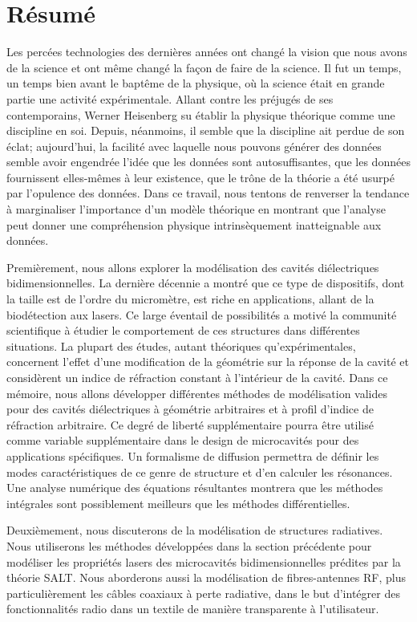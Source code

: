 \chapter*{Résumé}
Les percées technologies des dernières années ont changé
la vision que nous avons de la science et ont même changé
la façon de faire de la science. Il fut un temps, un temps
bien avant le baptême de la physique, où la science était
en grande partie une activité expérimentale. Allant 
contre les préjugés de ses contemporains, Werner
Heisenberg su établir la physique théorique comme une
discipline en soi. Depuis, néanmoins, il semble que la
discipline ait perdue de son éclat; aujourd'hui, la facilité
avec laquelle nous pouvons générer des données semble avoir
engendrée l'idée que les données sont autosuffisantes, 
que les données fournissent elles-mêmes à leur existence, 
que le trône de la théorie a été usurpé par l'opulence
des données. Dans ce travail, nous tentons de renverser
la tendance à marginaliser l'importance d'un modèle 
théorique en montrant que l'analyse peut donner une 
compréhension physique intrinsèquement inatteignable 
aux données. 

Premièrement, nous allons explorer la modélisation des
cavités diélectriques bidimensionnelles. La dernière
décennie a montré que ce type de dispositifs, dont la 
taille est de l'ordre du micromètre, est riche en applications, 
allant de la biodétection aux lasers. Ce large éventail de
possibilités a motivé la communité scientifique à étudier
le comportement de ces structures dans différentes situations.
La plupart des études, autant théoriques qu'expérimentales, 
concernent l'effet d'une modification de la géométrie 
sur la réponse de la cavité et considèrent un 
indice de réfraction constant à l'intérieur de la cavité. 
Dans ce mémoire, nous allons développer différentes méthodes
de modélisation valides pour des cavités diélectriques à géométrie
arbitraires et à profil d'indice de réfraction arbitraire. Ce
degré de liberté supplémentaire pourra être utilisé comme variable
supplémentaire dans le design de microcavités pour des applications
spécifiques. 
Un formalisme de diffusion permettra de définir les modes caractéristiques
de ce genre de structure et d'en calculer les résonances. Une analyse
numérique des équations résultantes montrera que les méthodes intégrales
sont possiblement meilleurs que les méthodes différentielles.

Deuxièmement, nous discuterons de la modélisation de structures
radiatives. Nous utiliserons les méthodes développées dans la section
précédente pour modéliser les propriétés lasers des microcavités
bidimensionnelles prédites par la théorie SALT. Nous aborderons
aussi la modélisation de fibres-antennes RF, plus particulièrement
les câbles coaxiaux à perte radiative, dans le but d'intégrer
des fonctionnalités radio dans un textile de manière transparente
à l'utilisateur. 